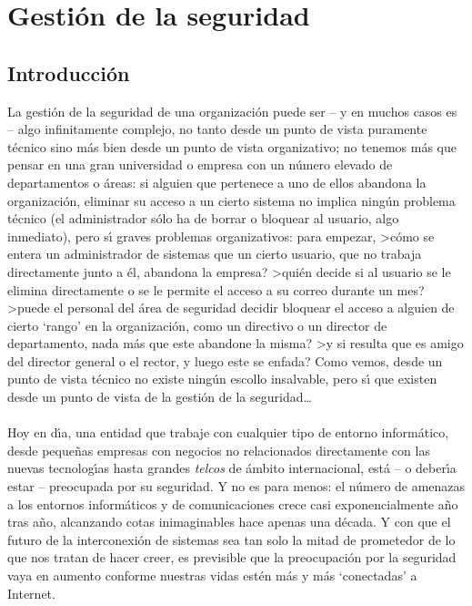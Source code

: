 \chapter{Gesti\'on de la seguridad}
\section{Introducci\'on}
La gesti\'on de la seguridad de una organizaci\'on puede ser -- y en muchos
casos es -- algo infinitamente complejo, no tanto desde un punto de vista
puramente t\'ecnico sino m\'as bien desde un punto de vista organizativo; no 
tenemos m\'as
que pensar en una gran universidad o empresa con un n\'umero elevado de
departamentos o \'areas: si alguien que pertenece a uno de ellos abandona la
organizaci\'on, eliminar su acceso a un cierto sistema no implica ning\'un 
problema t\'ecnico (el administrador s\'olo ha de borrar o bloquear al usuario,
algo inmediato), pero s\'{\i} graves problemas organizativos: para empezar, 
>c\'omo se entera un administrador de sistemas que un cierto usuario, que no
trabaja directamente junto a \'el, abandona la empresa? >qui\'en decide si al
usuario se le elimina directamente o se le permite el acceso a su correo 
durante un mes? >puede el personal del \'area de seguridad decidir bloquear el
acceso a alguien de cierto `rango' en la organizaci\'on, como un directivo o 
un director de departamento, nada m\'as que este abandone la misma? >y si 
resulta que es amigo del director general o el rector, y luego este se enfada? 
Como vemos, desde un punto de vista t\'ecnico no existe ning\'un escollo 
insalvable, pero s\'{\i} que existen desde un punto de vista de la gesti\'on de 
la seguridad\ldots\\
\\Hoy en d\'{\i}a, una entidad que trabaje con cualquier tipo de entorno 
inform\'atico, desde peque\~nas empresas con negocios no relacionados 
directamente con las nuevas tecnolog\'{\i}as hasta grandes {\it telcos} de
\'ambito internacional, est\'a -- o deber\'{\i}a estar -- preocupada por su
seguridad. Y no es para menos: el n\'umero de amenazas a los entornos 
inform\'aticos y de comunicaciones crece casi exponencialmente a\~no tras a\~no,
alcanzando cotas inimaginables hace apenas una d\'ecada. Y con que el futuro de 
la interconexi\'on de sistemas sea tan solo la mitad de prometedor de lo que 
nos tratan de hacer creer, es previsible que la preocupaci\'on por la seguridad
vaya en aumento conforme nuestras vidas est\'en m\'as y m\'as `conectadas' a
Internet.\\
